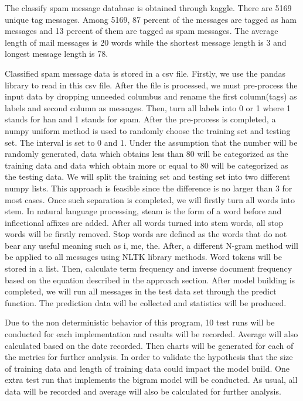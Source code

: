 \documentclass{article}
\begin{document}
The classify spam message database is obtained through kaggle. There are 5169 unique tag messages. Among 5169, 87 percent of the messages are tagged as ham messages and 13 percent of them are tagged as spam messages. The average length of mail messages is 20 words while the shortest message length is 3 and longest message length is 78. 


Classified spam message data is stored in a csv file. Firstly, we use the pandas library to read in this csv file. After the file is processed, we must pre-process the input data by dropping unneeded columbus and rename the first column(tags) as labels and second column as messages. Then, turn all labels into 0 or 1 where 1 stands for han and 1 stands for spam. After the pre-process is completed, a numpy uniform method is used to randomly choose the training set and testing set. The interval is set to 0 and 1. Under the assumption that the number will be randomly generated, data which obtains less than 80 will be categorized as the training data and data which obtain more or equal to 80 will be categorized as the testing data. We will split the training set and testing set into two different numpy lists. This approach is feasible since the difference is no larger than 3 for most cases. Once such separation is completed, we will firstly turn all words into stem. In natural language processing, steam is the form of a word before and inflectional affixes are added. After all words turned into stem words, all stop words will be firstly removed. Stop words are defined as the words that do not bear any useful meaning such as i, me, the. After, a different N-gram method will be applied to all messages using NLTK library methods. Word tokens will be stored in a list. Then, calculate term frequency and inverse document frequency based on the equation described in the approach section. After model building is completed, we will run all messages in the test data set through the predict function. The prediction data will be collected and statistics will be produced. 


Due to the non deterministic behavior of this program, 10 test runs will be conducted for each implementation and results will be recorded. Average will also calculated based on the date recorded. Then charts will be generated for each of the metrics for further analysis. 
In order to validate the hypothesis that the size of training data and length of training data could impact the model build. One extra test run that implements the bigram model will be conducted. As usual, all data will be recorded and average will also be calculated for further analysis. 
\end{document}
